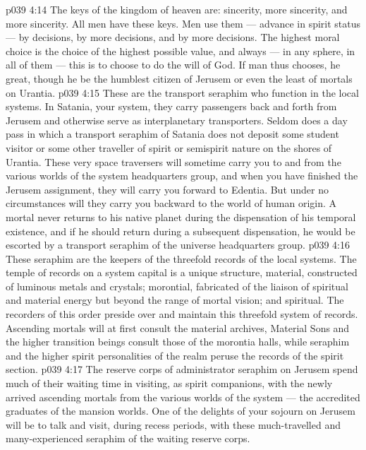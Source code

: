 \vs p039 4:14 The keys of the kingdom of heaven are: sincerity, more sincerity, and more sincerity. All men have these keys. Men use them --- advance in spirit status --- by decisions, by more decisions, and by more decisions. The highest moral choice is the choice of the highest possible value, and always --- in any sphere, in all of them --- this is to choose to do the will of God. If man thus chooses, he  great, though he be the humblest citizen of Jerusem or even the least of mortals on Urantia.
\vs p039 4:15 \bibnobreakspace {} These are the transport seraphim who function in the local systems. In Satania, your system, they carry passengers back and forth from Jerusem and otherwise serve as interplanetary transporters. Seldom does a day pass in which a transport seraphim of Satania does not deposit some student visitor or some other traveller of spirit or semispirit nature on the shores of Urantia. These very space traversers will sometime carry you to and from the various worlds of the system headquarters group, and when you have finished the Jerusem assignment, they will carry you forward to Edentia. But under no circumstances will they carry you backward to the world of human origin. A mortal never returns to his native planet during the dispensation of his temporal existence, and if he should return during a subsequent dispensation, he would be escorted by a transport seraphim of the universe headquarters group.
\vs p039 4:16 \bibnobreakspace {} These seraphim are the keepers of the threefold records of the local systems. The temple of records on a system capital is a unique structure,  material, constructed of luminous metals and crystals;  morontial, fabricated of the liaison of spiritual and material energy but beyond the range of mortal vision; and  spiritual. The recorders of this order preside over and maintain this threefold system of records. Ascending mortals will at first consult the material archives, Material Sons and the higher transition beings consult those of the morontia halls, while seraphim and the higher spirit personalities of the realm peruse the records of the spirit section.
\vs p039 4:17 \bibnobreakspace {} The reserve corps of administrator seraphim on Jerusem spend much of their waiting time in visiting, as spirit companions, with the newly arrived ascending mortals from the various worlds of the system --- the accredited graduates of the mansion worlds. One of the delights of your sojourn on Jerusem will be to talk and visit, during recess periods, with these much\hyp{}travelled and many\hyp{}experienced seraphim of the waiting reserve corps.

